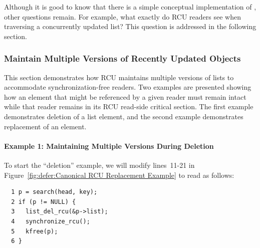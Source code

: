 Although it is good to know that there is a simple conceptual
implementation of , other questions remain.
For example, what exactly do RCU
readers see when traversing a concurrently updated list?
This question is addressed in the following section.

\subsubsection{Maintain Multiple Versions of Recently Updated Objects}
\label{sec:defer:Maintain Multiple Versions of Recently Updated Objects}

This section demonstrates how RCU maintains multiple versions of
lists to accommodate synchronization-free readers.
Two examples are presented showing how an element
that might be referenced by a given reader must remain intact
while that reader remains in its RCU read-side critical section.
The first example demonstrates deletion of a list element,
and the second example demonstrates replacement of an element.

\paragraph{Example 1: Maintaining Multiple Versions During Deletion}
\label{sec:defer:Example 1: Maintaining Multiple Versions During Deletion}

To start the ``deletion'' example,
we will modify lines~11-21 in
Figure~\ref{fig:defer:Canonical RCU Replacement Example}
to read as follows:

\vspace{5pt}
\begin{minipage}[t]{\columnwidth}
\begin{verbatim}
  1 p = search(head, key);
  2 if (p != NULL) {
  3   list_del_rcu(&p->list);
  4   synchronize_rcu();
  5   kfree(p);
  6 }
\end{verbatim}
\end{minipage}
\vspace{5pt}

